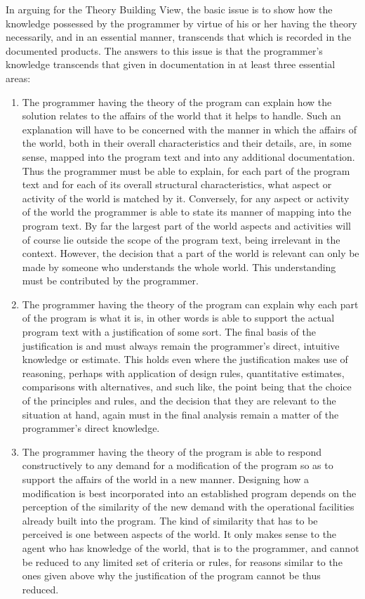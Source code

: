\documentclass[12pt,letterpaper,twocolumn]{article}
\begin{document}
In arguing for the Theory Building View, the basic issue is to show how the knowledge possessed by the programmer by virtue of his or her having the theory necessarily, and in an essential manner, transcends that which is recorded in the documented products. The answers to this issue is that the programmer's knowledge transcends that given in documentation in at least three essential areas:
\begin{enumerate}
\item The programmer having the theory of the program can explain how the solution relates to the affairs of the world that it helps to handle. Such an explanation will have to be concerned with the manner in which the affairs of the world, both in their overall characteristics and their details, are, in some sense, mapped into the program text and into any additional documentation. Thus the programmer must be able to explain, for each part of the program text and for each of its overall structural characteristics, what aspect or activity of the world is matched by it. Conversely, for any aspect or activity of the world the programmer is able to state its manner of mapping into the program text. By far the largest part of the world aspects and activities will of course lie outside the scope of the program text, being irrelevant in the context. However, the decision that a part of the world is relevant can only be made by someone who understands the whole world. This understanding must be contributed by the programmer.

\item The programmer having the theory of the program can explain why each part of the program is what it is, in other words is able to support the actual program text with a justification of some sort. The final basis of the justification is and must always remain the programmer's direct, intuitive knowledge or estimate. This holds even where the justification makes use of reasoning, perhaps with application of design rules, quantitative estimates, comparisons with alternatives, and such like, the point being that the choice of the principles and rules, and the decision that they are relevant to the situation at hand, again must in the final analysis remain a matter of the programmer's direct knowledge.

\item The programmer having the theory of the program is able to respond constructively to any demand for a modification of the program so as to support the affairs of the world in a new manner. Designing how a modification is best incorporated into an established program depends on the perception of the similarity of the new demand with the operational facilities already built into the program. The kind of similarity that has to be perceived is one between aspects of the world. It only makes sense to the agent who has knowledge of the world, that is to the programmer, and cannot be reduced to any limited set of criteria or rules, for reasons similar to the ones given above why the justification of the program cannot be thus reduced.
\end{enumerate}
\end{document}

